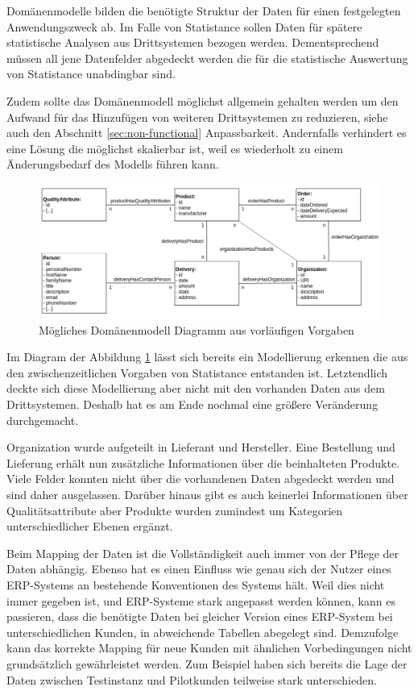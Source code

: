 Domänenmodelle bilden die benötigte Struktur der Daten für einen festgelegten Anwendungszweck ab. Im Falle von Statistance sollen Daten für spätere statistische Analysen aus Drittsystemen bezogen werden. Dementsprechend müssen all jene Datenfelder abgedeckt werden die für die statistische Auswertung von Statistance unabdingbar sind.

Zudem sollte das Domänenmodell möglichst allgemein gehalten werden um den Aufwand für das Hinzufügen von weiteren Drittsystemen zu reduzieren, siehe auch den Abschnitt \ref{sec:non-functional} Anpassbarkeit. Andernfalls verhindert es eine Lösung die möglichst skalierbar ist, weil es wiederholt zu einem Änderungsbedarf des Modells führen kann.
\begin{figure}[!h]
\centering
\includegraphics[width=15cm]{images/0x_requirement_analysis/potential_domainmodels.png}
\caption{Mögliches Domänenmodell Diagramm aus vorläufigen Vorgaben}
\label{fig:preliminary_domain_model}
\end{figure}

Im Diagram der Abbildung \ref{fig:preliminary_domain_model} lässt sich bereits ein Modellierung erkennen die aus den zwischenzeitlichen Vorgaben von Statistance entstanden ist. Letztendlich deckte sich diese Modellierung aber nicht mit den vorhanden Daten aus dem Drittsystemen. Deshalb hat es am Ende nochmal eine größere Veränderung durchgemacht.

Organization wurde aufgeteilt in Lieferant und Hersteller. Eine Bestellung und Lieferung erhält nun zusätzliche Informationen über die beinhalteten Produkte. Viele Felder konnten nicht über die vorhandenen Daten abgedeckt werden und sind daher ausgelassen. Darüber hinaus gibt es auch keinerlei Informationen über Qualitätsattribute aber Produkte wurden zumindest um Kategorien unterschiedlicher Ebenen ergänzt.

Beim Mapping der Daten ist die Vollständigkeit auch immer von der Pflege der Daten abhängig. Ebenso hat es einen Einfluss wie genau sich der Nutzer eines ERP-Systems an bestehende Konventionen des Systems hält. Weil dies nicht immer gegeben ist, und ERP-Systeme stark angepasst werden können, kann es passieren, dass die benötigte Daten bei gleicher Version eines ERP-System bei unterschiedlichen Kunden, in abweichende Tabellen abegelegt sind. Demzufolge kann das korrekte Mapping für neue Kunden mit ähnlichen Vorbedingungen nicht grundsätzlich gewährleistet werden. Zum Beispiel haben sich bereits die Lage der Daten zwischen Testinstanz und Pilotkunden teilweise stark unterschieden.

